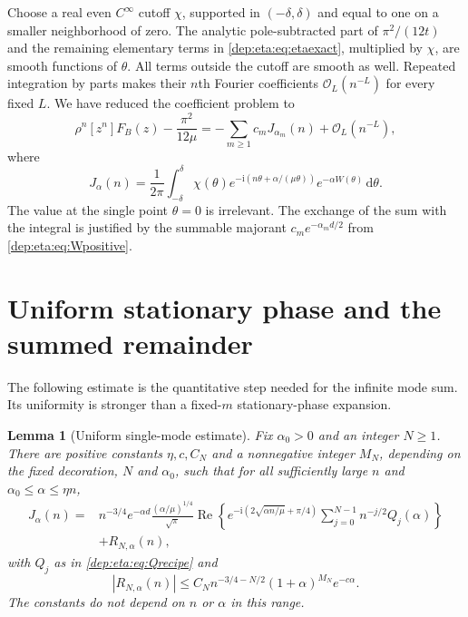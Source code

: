 \documentclass[11pt]{article}
\newtheorem{lemma}[theorem]{Lemma}
\theoremstyle{definition}\newtheorem{definition}[theorem]{Definition}
\theoremstyle{remark}\newtheorem{remark}[theorem]{Remark}
\newcommand{\OO}{\mathcal O}
\newcommand{\ii}{\mathrm i}
\newcommand{\dd}{\,\mathrm d}
\DeclareMathOperator{\Rea}{Re}
\begin{document}
Choose a real even $C^\infty$ cutoff $\chi$, supported in
$(-\delta,\delta)$ and equal to one on a smaller neighborhood of
zero. The analytic pole-subtracted part of $\pi^2/(12t)$ and the
remaining elementary terms in \eqref{dep:eta:eq:etaexact}, multiplied by
$\chi$, are smooth functions of $\theta$. All terms outside the
cutoff are smooth as well. Repeated integration by parts makes their
$n$th Fourier coefficients $\OO_L(n^{-L})$ for every fixed $L$.
We have reduced the coefficient problem to
\begin{equation}\label{dep:eta:eq:reduction}
 \rho^n[z^n]F_B(z)-\frac{\pi^2}{12\mu}
 =-\sum_{m\ge1}c_mJ_{\alpha_m}(n)+\OO_L(n^{-L}),
\end{equation}
where
\begin{equation}\label{dep:eta:eq:J}
 J_\alpha(n)=\frac1{2\pi}\int_{-\delta}^{\delta}
   \chi(\theta)e^{-\ii(n\theta+\alpha/(\mu\theta))}
                     e^{-\alpha W(\theta)}\dd\theta.
\end{equation}
The value at the single point $\theta=0$ is irrelevant. The exchange
of the sum with the integral is justified by the summable majorant
$c_me^{-\alpha_md/2}$ from \eqref{dep:eta:eq:Wpositive}.

\section{Uniform stationary phase and the summed remainder}\label{dep:eta:sec:uniform}
The following estimate is the quantitative step needed for the
infinite mode sum. Its uniformity is stronger than a fixed-$m$
stationary-phase expansion.

\begin{lemma}[Uniform single-mode estimate]\label{dep:eta:lem:uniform}
Fix $\alpha_0>0$ and an integer $N\ge1$. There are positive constants
$\eta,c,C_N$ and a nonnegative integer $M_N$, depending on the fixed
decoration, $N$ and $\alpha_0$, such that for all sufficiently large $n$ and
$\alpha_0\le\alpha\le\eta n$,
\begin{equation}\label{dep:eta:eq:Jasym}
\begin{split}
 J_\alpha(n)={}&n^{-3/4}e^{-\alpha d}
      \frac{(\alpha/\mu)^{1/4}}{\sqrt\pi}
      \Rea\left\{e^{-\ii(2\sqrt{\alpha n/\mu}+\pi/4)}
                  \sum_{j=0}^{N-1}n^{-j/2}Q_j(\alpha)\right\}\\
 &+R_{N,\alpha}(n),
\end{split}
\end{equation}
with $Q_j$ as in \eqref{dep:eta:eq:Qrecipe} and
\begin{equation}\label{dep:eta:eq:uniformerror}
 |R_{N,\alpha}(n)|\le
 C_Nn^{-3/4-N/2}(1+\alpha)^{M_N}e^{-c\alpha}.
\end{equation}
The constants do not depend on $n$ or $\alpha$ in this range.
\end{lemma}
\end{document}
